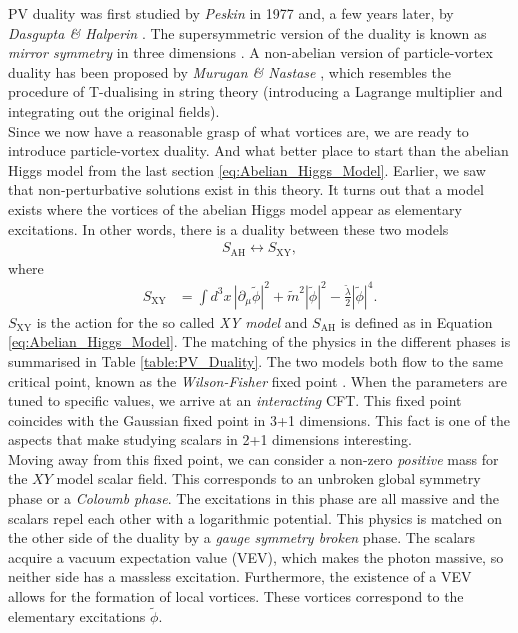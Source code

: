     \indent PV duality was first studied by \textit{Peskin} \cite{Peskin:1977kp} in 1977 and, a few years later, by \textit{Dasgupta \& Halperin} \cite{Dasgupta:1981zz}. The supersymmetric version of the duality is known as \textit{mirror symmetry} in three dimensions \cite{Intriligator:1996ex}. A non-abelian version of particle-vortex duality has been proposed by \textit{Murugan \& Nastase} \cite{Murugan:2015boa}, which resembles the procedure of T-dualising in string theory (introducing a Lagrange multiplier and integrating out the original fields).  \\
    \indent Since we now have a reasonable grasp of what vortices are, we are ready to introduce particle-vortex duality. And what better place to start than the abelian Higgs model from the last section \eqref{eq:Abelian_Higgs_Model}. Earlier, we saw that non-perturbative solutions exist in this theory. It turns out that a model exists where the vortices of the abelian Higgs model appear as elementary excitations. In other words, there is a duality between these two models
    \begin{align}
        S_{\text{AH}} \longleftrightarrow S_{\text{XY}}, \label{eq:PV-duality_Tong}
    \end{align}
    where
    \begin{align}
        S_{\text{XY}} &= \int d^3x \, |\partial_{\mu}\tilde{\phi}|^2+\tilde{m}^2 |\tilde{\phi}|^2 - \frac{\tilde{\lambda}}{2} |\tilde{\phi}|^4.
    \end{align}
    $S_{\text{XY}}$ is the action for the so called \textit{XY model} and $S_{\text{AH}}$ is defined as in Equation \eqref{eq:Abelian_Higgs_Model}. The matching of the physics in the different phases is summarised in Table \eqref{table:PV_Duality}. The two models both flow to the same critical point, known as the \textit{Wilson-Fisher} fixed point \cite{Wilson:1971dc}. When the parameters are tuned to specific values, we arrive at an \textit{interacting} CFT. This fixed point coincides with the Gaussian fixed point in 3+1 dimensions. This fact is one of the aspects that make studying scalars in 2+1 dimensions interesting.\\
    \indent Moving away from this fixed point, we can consider a non-zero \textit{positive} mass for the $XY$ model scalar field. This corresponds to an unbroken global symmetry phase or a \textit{Coloumb phase}. The excitations in this phase are all massive and the scalars repel each other with a logarithmic potential. This physics is matched on the other side of the duality by a \textit{gauge symmetry broken} phase. The scalars acquire a vacuum expectation value (VEV), which makes the photon massive, so neither side has a massless excitation. Furthermore, the existence of a VEV allows for the formation of local vortices. These vortices correspond to the elementary excitations $\tilde{\phi}$.\\
